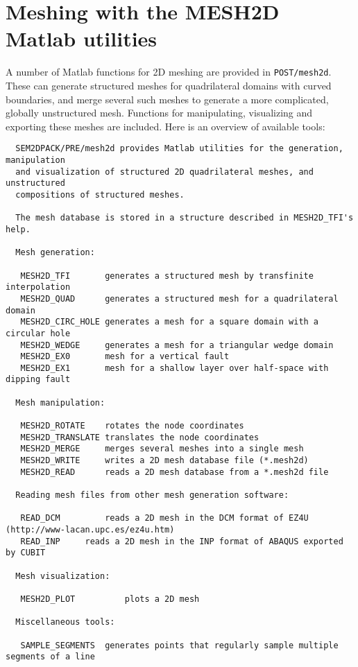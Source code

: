 \section{Meshing with the MESH2D Matlab utilities}
\label{Sec:mesh2d}

A number of Matlab functions for 2D meshing are provided in \texttt{POST/mesh2d}.
These can generate structured meshes for quadrilateral domains
with curved boundaries, and merge several such meshes to generate
a more complicated, globally unstructured mesh.
Functions for manipulating, visualizing and exporting these meshes are included.
Here is an overview of available tools:

\begin{verbatim}
  SEM2DPACK/PRE/mesh2d provides Matlab utilities for the generation, manipulation 
  and visualization of structured 2D quadrilateral meshes, and unstructured 
  compositions of structured meshes.
 
  The mesh database is stored in a structure described in MESH2D_TFI's help.
 
  Mesh generation:
 
   MESH2D_TFI     	generates a structured mesh by transfinite interpolation
   MESH2D_QUAD    	generates a structured mesh for a quadrilateral domain
   MESH2D_CIRC_HOLE	generates a mesh for a square domain with a circular hole 
   MESH2D_WEDGE		generates a mesh for a triangular wedge domain
   MESH2D_EX0		mesh for a vertical fault
   MESH2D_EX1		mesh for a shallow layer over half-space with dipping fault
 
  Mesh manipulation:
 
   MESH2D_ROTATE   	rotates the node coordinates 
   MESH2D_TRANSLATE	translates the node coordinates
   MESH2D_MERGE    	merges several meshes into a single mesh
   MESH2D_WRITE  	writes a 2D mesh database file (*.mesh2d)
   MESH2D_READ 		reads a 2D mesh database from a *.mesh2d file 
 
  Reading mesh files from other mesh generation software:
 
   READ_DCM 		reads a 2D mesh in the DCM format of EZ4U (http://www-lacan.upc.es/ez4u.htm)
   READ_INP		reads a 2D mesh in the INP format of ABAQUS exported by CUBIT
 
  Mesh visualization:
 
   MESH2D_PLOT        	plots a 2D mesh
 
  Miscellaneous tools:
 
   SAMPLE_SEGMENTS	generates points that regularly sample multiple segments of a line
\end{verbatim}

